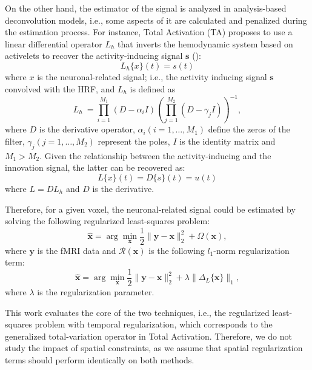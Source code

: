 On the other hand, the estimator of the signal is analyzed in analysis-based deconvolution models, i.e., some aspects of it are calculated and penalized during the estimation process. For instance, Total Activation (TA) proposes to use a linear differential operator \(L_h\) that inverts the hemodynamic system based on activelets to recover the activity-inducing signal \(\mathbf{s}\) (\citealt{karahanoglu2013TotalActivationFMRI,khalidov2011activelets,karahanoglu2011SignalProcessingApproacha}):
\begin{equation}
    L_h\{x\}(t) = s(t)
\end{equation}
where \(x\) is the neuronal-related signal; i.e., the activity inducing signal \(\mathbf{s}\) convolved with the HRF, and \(L_h\) is defined as
\begin{equation}
    L_h\ = \prod_{i=1}^{M_1} (D-\alpha_i I) (\prod_{j=1}^{M_2} (D - \gamma_j I))^{-1},
\end{equation}
where \(D\) is the derivative operator, \(\alpha_i (i=1, \hdots, M_1)\) define the zeros of the filter, \(\gamma_j (j=1, \hdots, M_2)\) represent the poles, \(I\) is the identity matrix and \(M_1 > M_2\). Given the relationship between the activity-inducing and the innovation signal, the latter can be recovered as:
\begin{equation}
    L\{x\}(t) = D\{s\}(t) = u(t)
\end{equation}
where \(L = DL_h\) and \(D\) is the derivative.

Therefore, for a given voxel, the neuronal-related signal could be estimated by solving the following regularized least-squares problem:
\begin{equation}
    \hat{\mathbf{x}} = \arg \min_{\mathbf{x}} \frac{1}{2} \| \mathbf{y} - \mathbf{x} \|_2^2 + \Omega(\mathbf{x}),
\end{equation}
where \(\mathbf{y}\) is the fMRI data and \(\mathcal{R}(\mathbf{x})\) is the following \(l_1\)-norm regularization term:
\begin{equation}
    \hat{\mathbf{x}} = \arg \min_{\mathbf{x}} \frac{1}{2} \| \mathbf{y} - \mathbf{x} \|_2^2 + \lambda \| \Delta_L \{\mathbf{x}\} \|_1,
\end{equation}
where \(\lambda\) is the regularization parameter.

This work evaluates the core of the two techniques, i.e., the regularized least-squares problem with temporal regularization, which corresponds to the generalized total-variation operator in Total Activation. Therefore, we do not study the impact of spatial constraints, as we assume that spatial regularization terms should perform identically on both methods.


